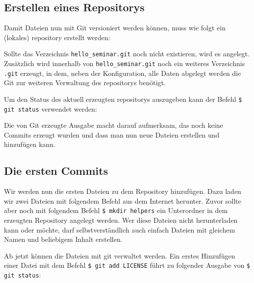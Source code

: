 \subsection{Erstellen eines Repositorys}\label{startup}
Damit Dateien nun mit Git versioniert werden können, muss wie folgt ein
(lokales) \gls{repository} erstellt werden:



Sollte das Verzeichnis \texttt{hello\_seminar.git} noch nicht existieren, wird
es angelegt. Zusätzlich wird innerhalb von \texttt{hello\_seminar.git} noch ein
weiteres Verzeichnis \texttt{.git} erzeugt, in dem, neben der Konfiguration,
alle Daten abgelegt werden die Git zur weiteren Verwaltung des \glspl{repository}
benötigt.

Um den Status des aktuell erzeugten \glspl{repository} auszugeben kann der
Befehl \texttt{\$ git status} verwendet werden:



Die von Git erzeugte Ausgabe macht darauf aufmerksam, das noch keine Commits
erzeugt wurden und dass man nun neue Dateien erstellen und hinzufügen kann.

\subsection{Die ersten Commits}\label{sec:first_commits}

Wir werden nun die ersten Dateien zu dem Repository hinzufügen. Dazu laden wir
zwei Dateien mit folgendem Befehl aus dem Internet herunter. Zuvor sollte aber
noch mit folgendem Befehl \texttt{\$ mkdir helpers} ein Unterordner in dem
erzeugten Repository angelegt werden. Wer diese Dateien nicht herunterladen
kann oder möchte, darf selbstverständlich auch einfach Dateien mit gleichem
Namen und beliebigem Inhalt erstellen.



Ab jetzt können die Dateien mit \gls{git} verwaltet werden. Ein erstes
Hinzufügen einer Datei mit dem Befehl \texttt{\$ git add LICENSE} führt zu
folgender Ausgabe von \texttt{\$ git status}:



